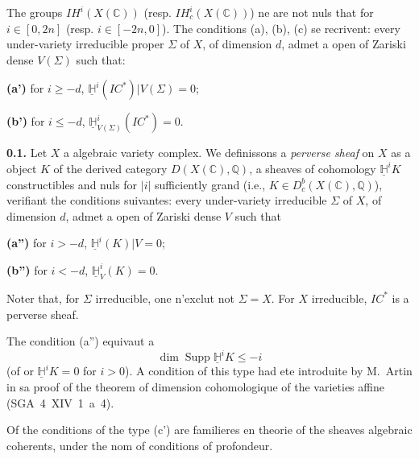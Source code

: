\documentclass[12pt,a4paper]{article}
\theoremstyle{plain}
\theoremstyle{definition}
\theoremstyle{remark}
\DeclareMathOperator{\Supp}{Supp}
\DeclareMathOperator{\pdim}{dim}
\newcommand{\IH}{\mathit{IH}}
\newcommand{\HH}{\mathbb{H}}
\newcommand{\IC}{\mathit{IC}}
\newcommand{\CC}{\mathbb{C}}
\newcommand{\QQ}{\mathbb{Q}}
\begin{document}
The groups $\IH^{i}(X(\CC))$ (resp. $\IH^{i}_{c}(X(\CC))$) ne are not nuls that for $i \in [0, 2n]$ (resp. $i \in [-2n, 0]$). The conditions (a), (b), (c) se recrivent: every under-variety irreducible proper $\Sigma$ of $X$, of dimension $d$, admet a open of Zariski dense $V(\Sigma)$ such that:

\medskip

\noindent
\textbf{(a')} for $i \geq -d$, $\underline{\HH}^{i}(\IC^{*})|V(\Sigma) = 0$;

\smallskip

\noindent
\textbf{(b')} for $i \leq -d$, $\underline{\HH}^{i}_{V(\Sigma)}(\IC^{*}) = 0$.

\medskip

\noindent
\textbf{0.1.} Let $X$ a algebraic variety complex. We definissons a \emph{perverse sheaf} on $X$ as a object $K$ of the derived category $D(X(\CC), \QQ)$, a sheaves of cohomology $\underline{\HH}^{i}K$ constructibles and nuls for $|i|$ sufficiently grand (i.e., $K \in D^{b}_{c}(X(\CC), \QQ)$), verifiant the conditions suivantes: every under-variety irreducible $\Sigma$ of $X$, of dimension $d$, admet a open of Zariski dense $V$ such that

\medskip

\noindent
\textbf{(a'')} for $i > -d$, $\underline{\HH}^{i}(K)|V = 0$;

\smallskip

\noindent
\textbf{(b'')} for $i < -d$, $\underline{\HH}^{i}_{V}(K) = 0$.

\medskip

Noter that, for $\Sigma$ irreducible, one n'exclut not $\Sigma = X$. For $X$ irreducible, $\IC^{*}$ is a perverse sheaf.

The condition (a'') equivaut a
\[
\pdim \Supp \underline{\HH}^{i}K \leq -i
\]
(of or $\underline{\HH}^{i}K = 0$ for $i > 0$). A condition of this type had ete introduite by M.~Artin in sa proof of the theorem of dimension cohomologique of the varieties affine (SGA~4~XIV~1~a~4).

\medskip

Of the conditions of the type (c') are familieres en theorie of the sheaves algebraic coherents, under the nom of conditions of profondeur.

\medskip
\end{document}
